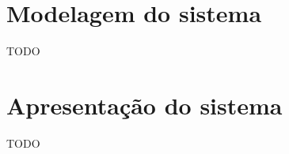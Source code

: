 

\section{Modelagem do sistema}\label{sec:modelagemSistema}

TODO





\section{Apresentação do sistema}\label{sec:apresentacaoSistema}

TODO


